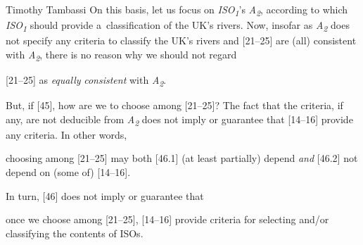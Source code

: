 \begin{artengenv}{Timothy Tambassi}
On this basis, let us focus on \textit{ISO}\textit{\textsubscript{1}}'s \textit{A}\textit{\textsubscript{2}}, according to which \textit{ISO}\textit{\textsubscript{1}} should provide a~classification of the UK's rivers. Now, insofar as \textit{A}\textit{\textsubscript{2}} does not specify any criteria to classify the UK's rivers and [21–25] are (all) consistent with \textit{A}\textit{\textsubscript{2}}, there is no reason why we should not regard



\setcounter{saveenumtambassi}{\value{enumi}}

\begin{enumerate}[label={[\arabic*]}]

\setcounter{enumi}{\value{saveenumtambassi}}

\item {[21–25]}  as \textit{equally} \textit{consistent} with \textit{A}\textit{\textsubscript{2}}.

\end{enumerate}

But, if [45], how are we to choose among [21–25]? The fact that the criteria, if any, are not deducible from \textit{A}\textit{\textsubscript{2}} does not imply or guarantee that [14–16] provide any criteria. In other words,



\setcounter{saveenumtambassi}{\value{enumi}}

\begin{enumerate}[label={[\arabic*]}]

\setcounter{enumi}{\value{saveenumtambassi}}

\item choosing among [21–25] may both [46.1] (at least partially) depend \textit{and} [46.2] not depend on (some of) [14–16].

\end{enumerate}

In turn, [46] does not imply or guarantee that



\setcounter{saveenumtambassi}{\value{enumi}}

\begin{enumerate}[label={[\arabic*]}]

\setcounter{enumi}{\value{saveenumtambassi}}

\item once we choose among [21–25], [14–16] provide criteria for selecting and/or classifying the contents of ISOs.


\end{enumerate}
\end{artengenv}
